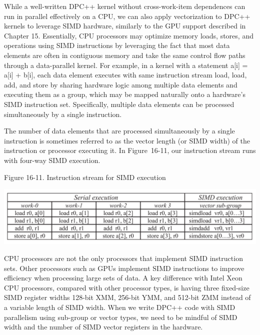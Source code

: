 While a well-written DPC++ kernel without cross-work-item dependences can run in parallel effectively on a CPU, we can also apply vectorization to DPC++ kernels to leverage SIMD hardware, similarly to the GPU support described in Chapter 15. Essentially, CPU processors may optimize memory loads, stores, and operations using SIMD instructions by leveraging the fact that most data elements are often in contiguous memory and take the same control flow paths through a data-parallel kernel. For example, in a kernel with a statement a[i] = a[i] + b[i], each data element executes with same instruction stream load, load, add, and store by sharing hardware logic among multiple data elements and executing them as a group, which may be mapped naturally onto a hardware’s SIMD instruction set. Specifically, multiple data elements can be processed simultaneously by a single instruction.\par

The number of data elements that are processed simultaneously by a single instruction is sometimes referred to as the vector length (or SIMD width) of the instruction or processor executing it. In Figure 16-11, our instruction stream runs with four-way SIMD execution.\par

\hspace*{\fill} \par %
Figure 16-11. Instruction stream for SIMD execution
\begin{center}
	\includegraphics[width=1.0\textwidth]{content/chapter-16/images/10}
\end{center}

CPU processors are not the only processors that implement SIMD instruction sets. Other processors such as GPUs implement SIMD instructions to improve efficiency when processing large sets of data. A key difference with Intel Xeon CPU processors, compared with other processor types, is having three fixed-size SIMD register widths 128-bit XMM, 256-bit YMM, and 512-bit ZMM instead of a variable length of SIMD width. When we write DPC++ code with SIMD parallelism using sub-group or vector types, we need to be mindful of SIMD width and the number of SIMD vector registers in the hardware.\par

